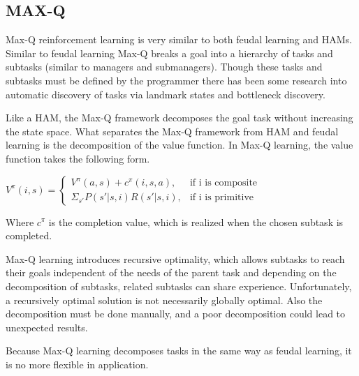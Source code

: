 \subsection{MAX-Q}
Max-Q reinforcement learning is very similar to both feudal learning and
HAMs. Similar to feudal learning Max-Q breaks a goal into a hierarchy of tasks
and subtasks (similar to managers and submanagers). Though these tasks and
subtasks must be defined by the programmer there has been some research into
automatic discovery of tasks via landmark states and bottleneck discovery.

Like a HAM, the Max-Q framework decomposes the goal task without increasing
the state space. What separates the Max-Q framework from HAM and feudal
learning is the decomposition of the value function. In Max-Q learning, the
value function takes the following form.

\begin{math}
V^{\pi}(i, s) =
\begin{cases}
V^{\pi}(a, s) + c^{\pi}(i, s, a), & \text{if i is composite}\\
\Sigma_{s'}P(s'|s, i)R(s'|s, i), & \text{if i is primitive}
\end{cases}
\end{math}

Where $c^{\pi}$ is the completion value, which is realized when the chosen
subtask is completed. \cite{Dietterich}

Max-Q learning introduces recursive optimality, which allows subtasks to reach
their goals independent of the needs of the parent task and depending on the
decomposition of subtasks, related subtasks can share experience. Unfortunately,
a recursively optimal solution is not necessarily globally optimal. Also
the decomposition must be done manually, and a poor decomposition could lead
to unexpected results.

Because Max-Q learning decomposes tasks in the same way as feudal learning, it is no more flexible in application.

